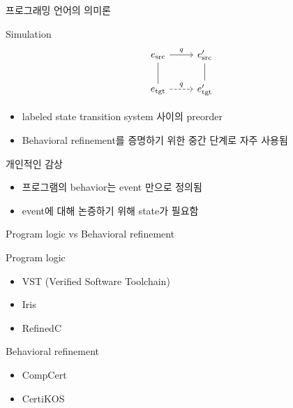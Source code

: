 \documentclass{beamer}
\begin{document}
\begin{frame}[fragile]{프로그래밍 언어의 의미론}

  \begin{block}{Simulation}
    \[
      \begin{tikzcd}
        e_{\text{src}} \arrow{r}{q} \arrow[dash]{d} & e_{\text{src}}' \arrow[dash]{d} \\
        e_{\text{tgt}} \arrow[dashed]{r}{q} & e_{\text{tgt}}'
      \end{tikzcd}
    \]
    
    \begin{itemize}
      \item labeled state transition system 사이의 preorder
      \item Behavioral refinement를 증명하기 위한 중간 단계로 자주 사용됨
    \end{itemize}
  \end{block}

  \pause
  \begin{block}{개인적인 감상}
    \begin{itemize}
      \item 프로그램의 behavior는 event 만으로 정의됨
      \item event에 대해 논증하기 위해 state가 필요함
    \end{itemize}
  \end{block}

\end{frame}

\begin{frame}{Program logic vs Behavioral refinement}

  \begin{block}{Program logic}
    \begin{itemize}
      \item VST (Verified Software Toolchain)
      \item Iris
      \item RefinedC
    \end{itemize}
  \end{block}

  \begin{block}{Behavioral refinement}
    \begin{itemize}
      \item CompCert
      \item CertiKOS
    \end{itemize}
  \end{block}

\end{frame}
\end{document}
